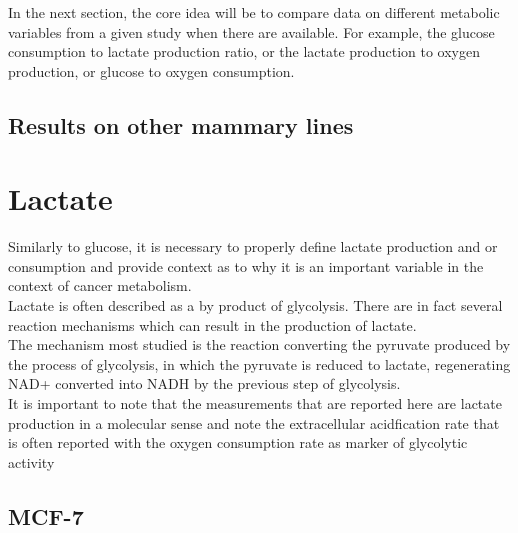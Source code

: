 \documentclass[11pt,a4paper]{article}
\begin{document}
In the next section, the core idea will be to compare data on different metabolic variables from a given study when there are available. For example, the glucose consumption to lactate production ratio, or the lactate production to oxygen production, or glucose to oxygen consumption.  


\subsection{Results on other mammary lines}

\section{Lactate}
Similarly to glucose, it is necessary to properly define lactate production and or consumption and provide context as to why it is an important  variable in the context of cancer metabolism.\\

Lactate is often described as a by product of glycolysis. There are in  fact several reaction mechanisms which can result in the production of lactate. \\

The mechanism most studied is the reaction converting the pyruvate produced  by the process of glycolysis, in which the pyruvate is reduced to lactate, regenerating NAD+ converted into NADH by the previous step of glycolysis.\cite{Berg2006}\\

It is important to note that the measurements that are reported here are lactate production in a molecular sense and note the extracellular acidfication rate that is often reported with the oxygen consumption rate as marker of glycolytic activity 

\subsection{MCF-7}
\end{document}
